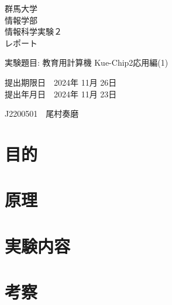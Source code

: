 \documentclass[titlepage]{ltjsarticle}
\begin{document}
\begin{titlepage}
    \begin{center}
        \thispagestyle{empty}
        \vspace*{5mm}
        {\fontsize{30pt}{40pt}\selectfont 群馬大学\\情報学部\\情報科学実験２\\レポート\\}
        \begin{flushleft}
            \vspace{10mm}
            {\LARGE 実験題目: 教育用計算機 Kue-Chip2応用編(1) }
        \end{flushleft}
        \vspace{60mm}
        {\LARGE 提出期限日　2024年 11月 26日\\}
        {\LARGE 提出年月日　2024年 11月 23日\\}
    \end{center}
    \begin{flushright}
        \vspace{40mm}
        {\LARGE J2200501　尾村奏磨\\}
    \end{flushright}
\end{titlepage}

\section{目的}

\section{原理}

\section{実験内容}

\section{考察}
\end{document}
